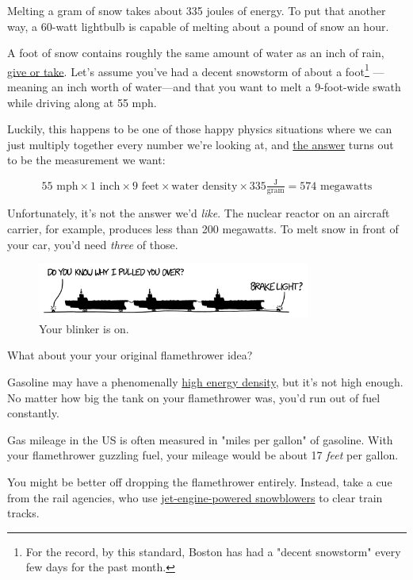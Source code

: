 {{Melting a gram of snow takes about 335 joules of energy. To put that another way, a 60-watt lightbulb is capable of melting about a pound of snow an hour.}

{A foot of snow contains roughly the same amount of water as an inch of rain, \href{http://www.theweatherprediction.com/habyhints/346/}{give or take}. Let's assume you've had a decent snowstorm of about a foot{\footnote{For the record, by this standard, Boston has had a "decent snowstorm" every few days for the past month.} } —meaning an inch worth of water—and that you want to melt a 9-foot-wide swath while driving along at 55 mph.}

{Luckily, this happens to be one of those happy physics situations where we can just multiply together every number we're looking at, and \href{http://www.wolframalpha.com/input/?i=55+mph+*+1+inch+*+9+feet+*+water+density+*+335+J\%2Fgram}{the answer} turns out to be the measurement we want:}

{\[55\text{ mph}\times1\text{ inch}\times9\text{ feet}\times\text{water density}\times335\tfrac{\text{J}}{\text{gram}}=574\text{ megawatts}\]}

{Unfortunately, it's not the answer we'd \emph{like}. The nuclear reactor on an aircraft carrier, for example, produces less than 200 megawatts. To melt snow in front of your car, you'd need \emph{three} of those.}

\begin{figure}[!htbp]
\centering
\includegraphics[scale=0.5, max width=0.8\textwidth]{imgs/a/130/legal.png}
\caption{Your blinker is on.}
\end{figure}

{What about your your original flamethrower idea?}

{Gasoline may have a phenomenally \href{http://what-if.xkcd.com/128/}{high energy density}, but it's not high enough. No matter how big the tank on your flamethrower was, you'd run out of fuel constantly.}

{Gas mileage in the US is often measured in "miles per gallon" of gasoline. With your flamethrower guzzling fuel, your mileage would be about 17 \emph{feet} per gallon.}

{You might be better off dropping the flamethrower entirely. Instead, take a cue from the rail agencies, who use \href{http://www.boston.com/news/local/massachusetts/articles/2011/01/23/mbtas\_mattapan\_line\_relies\_on\_snowzilla\_in\_worst\_weather/}{jet-engine-powered snowblowers} to clear train tracks.}

}
